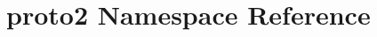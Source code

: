 \hypertarget{namespaceproto2}{\section{proto2 \-Namespace \-Reference}
\label{de/d03/namespaceproto2}
}
